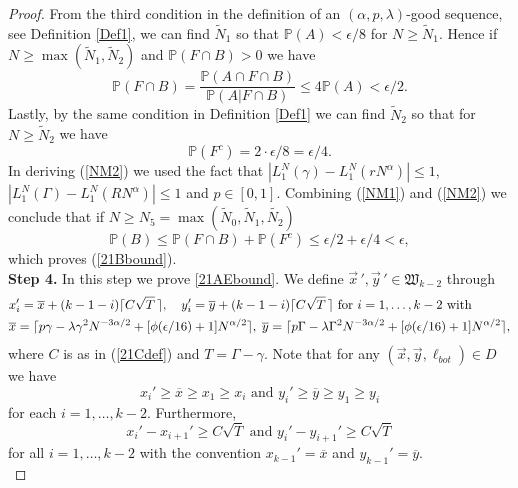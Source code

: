 \begin{proof}
	From the third condition in the definition of an $(\alpha,p,\lambda)$-good sequence, see Definition \ref{Def1}, we can find $\tilde{N}_1$ so that $\mathbb{P}(A) < \epsilon/8$ for $N\geq\tilde{N}_1$. Hence if $N \geq \max(\tilde{N}_1, \tilde{N}_2)$ and $\mathbb{P}(F\cap B) > 0$ we have
	\begin{equation}\label{NM1}
		\mathbb{P}(F \cap B) = \frac{\mathbb{P}(A\cap F \cap B)}{\mathbb{P}(A|F \cap B)} \leq 4\mathbb{P}(A) < \epsilon/2.
	\end{equation} 
	Lastly, by the same condition in Definition \ref{Def1} we can find $\tilde{N}_2$ so that for $N\geq\tilde{N}_2$ we have
	\begin{equation}\label{NM2}
		\mathbb{P}(F^c) = 2 \cdot \epsilon/8 = \epsilon/4.
	\end{equation}
	In deriving (\ref{NM2}) we used the fact that $|L_1^N(\gamma)  - L_1^N(rN^{\alpha})| \leq 1$, $|L_1^N(\Gamma)  - L_1^N(RN^{\alpha})| \leq 1$ and $p \in [0,1]$. Combining (\ref{NM1}) and (\ref{NM2}) we conclude that if $N \geq N_5 = \max(\tilde{N}_0, \tilde{N}_1, \tilde{N_2})$
	$$\mathbb{P}(B) \leq \mathbb{P}(F\cap B) + \mathbb{P}(F^c) \leq \epsilon/2 + \epsilon/4 < \epsilon,$$
	which proves (\ref{21Bbound}).\\
	
	\noindent\textbf{Step 4.} In this step we prove \eqref{21AEbound}. We define $\vec{x}\,',\vec{y}\,'\in\mathfrak{W}_{k-2}$ through
	\begin{equation}\label{21xybar}
		\begin{split}
			&x_i' = \overline{x} + (k-1-i)\lceil C\sqrt{T}\,\rceil, \quad y_i' = \overline{y} + (k-1-i)\lceil C\sqrt{T}\,\rceil \mbox{ for $i = 1, \dots, k-2$ with } \\
			&\overline{x} = \lceil  p\gamma  - \lambda \gamma^2 N^{-3\alpha/2} + [\phi(\epsilon/16) + 1]N^{\alpha/2} \rceil, \hspace{1mm} \overline{y} = \lceil p \Gamma - \lambda \Gamma^2 N^{-3\alpha/2} + [\phi(\epsilon/16) + 1]N^{\alpha/2} \rceil,
		\end{split}
	\end{equation} 
	where $C$ is as in (\ref{21Cdef}) and $T = \Gamma - \gamma$. Note that for any $(\vec{x}, \vec{y}, \ell_{bot}) \in D$ we have
	$$x_i' \geq \overline{x} \geq x_1 \geq x_i \mbox{ and }y_i' \geq \overline{y} \geq y_1 \geq y_i$$
	for each $i = 1, \dots, k-2$. Furthermore, 
	$$x_i' - x_{i+1}' \geq C\sqrt{T} \mbox{ and }y_i' - y_{i+1}' \geq C\sqrt{T}$$
	for all $i = 1, \dots, k-2$ with the convention $x_{k-1}' = \overline{x}$ and $y_{k-1}' = \overline{y}$. \\
	

\end{proof}
